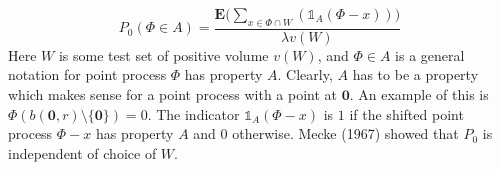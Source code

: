 %
\begin{equation}
  P_{0}(\Phi \in \mathit{A}) = \frac{\textbf{E}\Big(\sum_{x \in \Phi \cap W } (\mathbb{1}_{\mathit{A}} (\Phi - x))\Big)}{\lambda v(W)}
\end{equation}
%
Here $W$ is some test set of positive volume $v(W)$, and $\Phi \in \mathit{A}$ is a general notation for point process $\Phi$ has property $\mathit{A}$. Clearly, $\mathit{A}$ has to be a property
which makes sense for a point process with a point at $\textbf{0}$. An example of this is $\Phi(b(\textbf{0},r) \setminus \{\textbf{0}\})=0$. The indicator $\mathbb{1}_{\mathit{A}} (\Phi - x)$ is $1$ if the shifted point process $\Phi - x$ has property $\mathit{A}$ and $0$ otherwise.  Mecke (1967) showed that $P_0$ is independent of choice of $W$.
